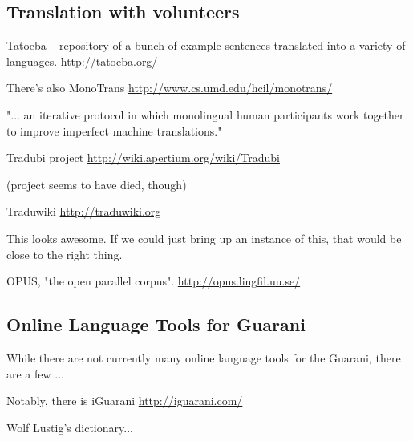\subsection{Translation with volunteers}

Tatoeba -- repository of a bunch of example sentences translated into a variety
of languages.
\url{http://tatoeba.org/}

There's also MonoTrans
\url{http://www.cs.umd.edu/hcil/monotrans/}

"... an iterative protocol in which monolingual human participants work
together to improve imperfect machine translations." 

Tradubi project
\url{http://wiki.apertium.org/wiki/Tradubi}

(project seems to have died, though)

Traduwiki
\url{http://traduwiki.org}

This looks awesome. If we could just bring up an instance of this, that would
be close to the right thing.

OPUS, "the open parallel corpus".
\url{http://opus.lingfil.uu.se/}

\subsection{Online Language Tools for Guarani}

While there are not currently many online language tools for the Guarani, there
are a few ...

Notably, there is 
iGuarani
\url{http://iguarani.com/}

Wolf Lustig's dictionary...

